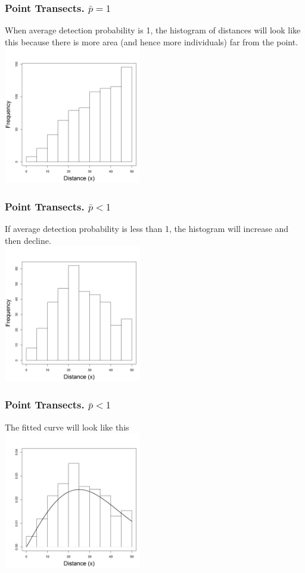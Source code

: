 \documentclass[color=usenames,dvipsnames,handout]{beamer}\usepackage[]{graphicx}\usepackage[]{xcolor}
\begin{document}
\begin{frame}
  \frametitle{Point Transects. $\bar{p}=1$}
  \centering
  When average detection probability is 1, the histogram of distances
  will look like this because there is more area (and hence more
  individuals) far from the point. \\
  \includegraphics[width=6cm]{figs/detfun5} \\
\end{frame}




\begin{frame}
  \frametitle{Point Transects. $\bar{p} < 1$}
\begin{center}
  If average detection probability is less than 1, the histogram will
  increase and then decline. \\
  \includegraphics[width=6cm]{figs/detfun6}
\end{center}
\end{frame}




\begin{frame}
  \frametitle{Point Transects. $\bar{p} < 1$}
\begin{center}
  The fitted curve will look like this \\
  \includegraphics[width=6cm]{figs/detfun7}
\end{center}
\end{frame}
\end{document}
